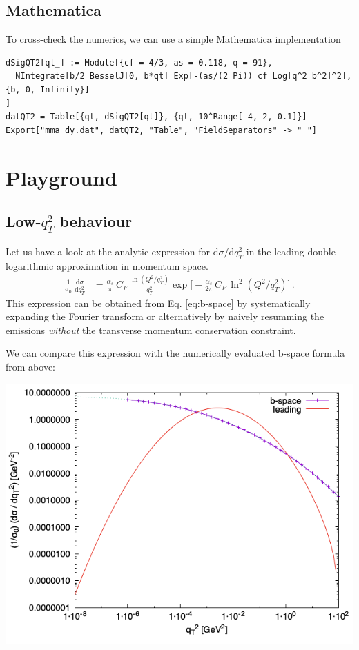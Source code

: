 \documentclass[11pt]{article}
\begin{document}
\subsection{Mathematica}
\label{sec:org886b734}
To cross-check the numerics, we can use a simple Mathematica implementation
\begin{verbatim}
dSigQT2[qt_] := Module[{cf = 4/3, as = 0.118, q = 91},
  NIntegrate[b/2 BesselJ[0, b*qt] Exp[-(as/(2 Pi)) cf Log[q^2 b^2]^2], {b, 0, Infinity}]
]
datQT2 = Table[{qt, dSigQT2[qt]}, {qt, 10^Range[-4, 2, 0.1]}]
Export["mma_dy.dat", datQT2, "Table", "FieldSeparators" -> " "]
\end{verbatim}
\section{Playground}
\label{sec:orgb690ba2}

\subsection{Low-\(q_T^2\) behaviour}
\label{sec:org6bbd93e}
Let us have a look at the analytic expression for \(\mathrm{d}\sigma/\mathrm{d}q_T^2\) in the leading double-logarithmic approximation in momentum space.
\begin{align}
  \frac{1}{\sigma_0}\,\frac{\mathrm{d}\sigma}{\mathrm{d}q_T^2}
  &=
  \frac{\alpha_s}{\pi}\, C_F \, \frac{\ln(Q^2 / q_T^2)}{q_T^2}
  \exp\Big[
    -\frac{\alpha_s}{2\pi}\, C_F \, \ln^2(Q^2 / q_T^2)
  \Big]
  \,.
\end{align}
This expression can be obtained from Eq. \eqref{eq:b-space} by systematically expanding the Fourier transform or alternatively by naively resumming the emissions \emph{without} the transverse momentum conservation constraint.

We can compare this expression with the numerically evaluated b-space formula from above:
\begin{center}
\includegraphics[width=.9\linewidth]{plot_QT2.png}
\label{}
\end{center}
\end{document}
